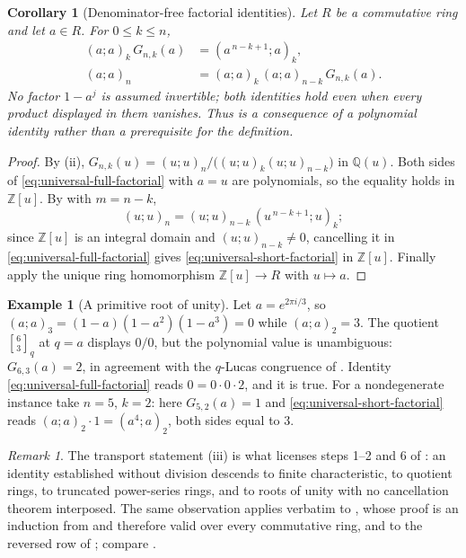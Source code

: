 \documentclass[11pt,oneside,openany]{book}
\newtheorem{corollary}[corollary]{Corollary}
\theoremstyle{definition}
\newtheorem{example}[example]{Example}
\theoremstyle{remark}
\newtheorem{remark}[remark]{Remark}
\newcommand{\qbinom}[2]{\genfrac{[}{]}{0pt}{}{#1}{#2}_{q}}
\newcommand{\Q}{\mathbb Q}
\newcommand{\Z}{\mathbb Z}
\begin{document}
\begin{corollary}[Denominator-free factorial identities]\label{cor:universal-factorial-identities}
Let $R$ be a commutative ring and let $a\in R$.  For $0\le k\le n$,
\begin{align}
 (a;a)_k\,G_{n,k}(a)&=(a^{\,n-k+1};a)_k,\label{eq:universal-short-factorial}\\
 (a;a)_n&=(a;a)_k\,(a;a)_{n-k}\,G_{n,k}(a).\label{eq:universal-full-factorial}
\end{align}
No factor $1-a^j$ is assumed invertible; both identities hold even when every product displayed in them vanishes.  Thus  is a consequence of a polynomial identity rather than a prerequisite for the definition.
\end{corollary}

\begin{proof}
By (ii), $G_{n,k}(u)=(u;u)_n/\bigl((u;u)_k(u;u)_{n-k}\bigr)$ in $\Q(u)$.  Both sides of \eqref{eq:universal-full-factorial} with $a=u$ are polynomials, so the equality holds in $\Z[u]$.  By  with $m=n-k$,
\[
 (u;u)_n=(u;u)_{n-k}\,(u^{\,n-k+1};u)_k;
\]
since $\Z[u]$ is an integral domain and $(u;u)_{n-k}\ne0$, cancelling it in \eqref{eq:universal-full-factorial} gives \eqref{eq:universal-short-factorial} in $\Z[u]$.  Finally apply the unique ring homomorphism $\Z[u]\to R$ with $u\mapsto a$.
\end{proof}

\begin{example}[A primitive root of unity]\label{ex:gaussian-root-of-unity}
Let $a=e^{2\pi i/3}$, so $(a;a)_3=(1-a)(1-a^2)(1-a^3)=0$ while $(a;a)_2=3$.  The quotient $\qbinom63$ at $q=a$ displays $0/0$, but the polynomial value is unambiguous: $G_{6,3}(a)=2$, in agreement with the $q$-Lucas congruence of .  Identity \eqref{eq:universal-full-factorial} reads $0=0\cdot0\cdot2$, and it is true.  For a nondegenerate instance take $n=5$, $k=2$: here $G_{5,2}(a)=1$ and \eqref{eq:universal-short-factorial} reads $(a;a)_2\cdot1=(a^4;a)_2$, both sides equal to $3$.
\end{example}

\begin{remark}
The transport statement (iii) is what licenses steps 1--2 and 6 of : an identity established without division descends to finite characteristic, to quotient rings, to truncated power-series rings, and to roots of unity with no cancellation theorem interposed.  The same observation applies verbatim to , whose proof is an induction from  and therefore valid over every commutative ring, and to the reversed row of ; compare .
\end{remark}
\end{document}
